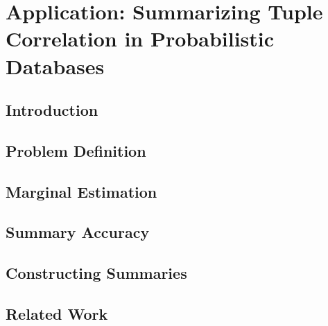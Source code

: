 \chapter{Application: Summarizing Tuple Correlation in Probabilistic Databases}
\begin{abstract}

\end{abstract}

\section{Introduction}


\section{Problem Definition}


\section{Marginal Estimation}


\section{Summary Accuracy}


\section{Constructing Summaries}
%

\section{Related Work}
